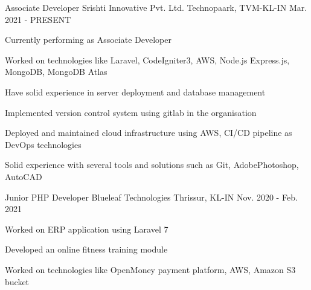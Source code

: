 

\begin{cventries}

  \cventry
    {Associate Developer} %
    {Srishti Innovative Pvt. Ltd.} %
    {Technopaark, TVM-KL-IN} %
    {Mar. 2021 - PRESENT} %
    {
      \begin{cvitems} %
        \item {Currently performing as Associate Developer}
        \item {Worked on technologies like Laravel, CodeIgniter3, AWS, Node.js Express.js, MongoDB, MongoDB Atlas}
        \item {Have solid experience in server deployment and database management}
        \item {Implemented version control system using gitlab in the organisation}
        \item {Deployed and maintained cloud infrastructure using AWS, CI/CD pipeline as DevOps technologies}
        \item {Solid experience with several tools and solutions such as Git, AdobePhotoshop, AutoCAD}
      \end{cvitems}
    }

  \cventry
    {Junior PHP Developer} %
    {Blueleaf Technologies} %
    {Thrissur, KL-IN} %
    {Nov. 2020 - Feb. 2021} %
    {
      \begin{cvitems} %
        \item {Worked on ERP application using Laravel 7}
        \item {Developed an online fitness training module}
        \item {Worked on technologies like OpenMoney payment platform, AWS, Amazon S3 bucket}
      \end{cvitems}
    }


\end{cventries}
